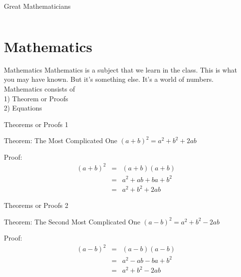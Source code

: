 \documentclass{beamer}
\begin{document}
\begin{frame}{Great Mathematicians}
\begin{columns}
\begin{column}{0.8\textwidth}
        \end{column}
    \end{columns}   
\end{frame}

\section{Mathematics}

\begin{frame}{Mathematics}
    Mathematics is a subject that we learn in the class. This is what you may have known. But it’s something else. It’s a world of numbers.\\
    \pause
    Mathematics consists of \\
    1) Theorem or Proofs \pause\\
    2) Equations\\
    
\end{frame}

\begin{frame}{Theorems or Proofs 1}
    \begin{block}{Theorem: The Most Complicated One}
        $(a+b)^2=a^2 + b^2 + 2ab$
    \end{block}
    \begin{exampleblock}{Proof:}
    \begin{eqnarray}
            (a+b)^2 & = & (a+b)(a+b) \nonumber \\
                    & = & a^2 + ab + ba + b^2\nonumber \\
                    & = & a^2 + b^2 +2ab\nonumber
    \end{eqnarray}
    \end{exampleblock}
\end{frame}

\begin{frame}{Theorems or Proofs 2}
    \begin{block}{Theorem: The Second Most Complicated One}
        $(a-b)^2=a^2 + b^2 - 2ab$
    \end{block}
    \begin{exampleblock}{Proof:}
        \begin{eqnarray}
            (a-b)^2 & = & (a-b)(a-b) \nonumber \\
                    & = & a^2 - ab - ba + b^2\nonumber \\
                    & = & a^2 + b^2 -2ab\nonumber
    \end{eqnarray}
    \end{exampleblock}
\end{frame}
\end{document}

